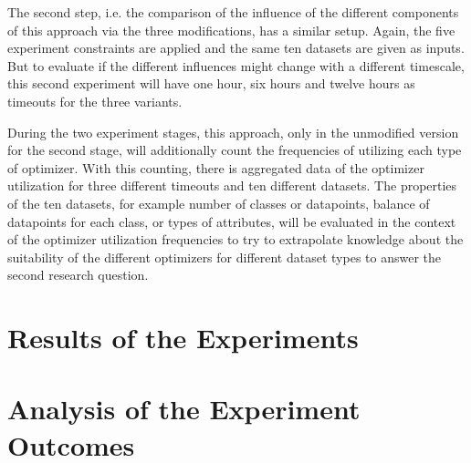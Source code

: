 The second step, i.e. the comparison of the influence of the different components of this approach via the three modifications, has a similar setup.
Again, the five experiment constraints are applied and the same ten datasets are given as inputs.
But to evaluate if the different influences might change with a different timescale, this second experiment will have one hour, six hours and twelve hours as timeouts for the three variants.

During the two experiment stages, this approach, only in the unmodified version for the second stage, will additionally count the frequencies of utilizing each type of optimizer.
With this counting, there is aggregated data of the optimizer utilization for three different timeouts and ten different datasets.
The properties of the ten datasets, for example number of classes or datapoints, balance of datapoints for each class, or types of attributes, will be evaluated in the context of the optimizer utilization frequencies to try to extrapolate knowledge about the suitability of the different optimizers for different dataset types to answer the second research question.

\section{Results of the Experiments}
\label{sec:evaluation:results}

\Blindtext

\section{Analysis of the Experiment Outcomes}
\label{sec:evaluation:analysis}

\Blindtext

